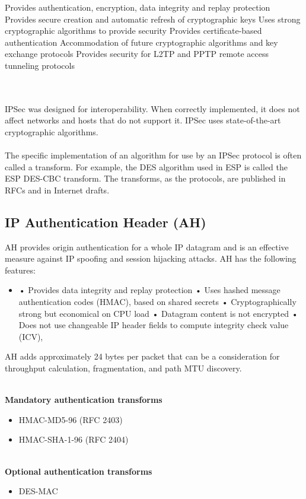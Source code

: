 \documentclass[10pt,a4paper]{article}
\begin{document}
\begin{itemize}
\begin{itemize}
\begin{itemize}
Provides authentication, encryption, data integrity and replay protection
Provides secure creation and automatic refresh of cryptographic keys
Uses strong cryptographic algorithms to provide security
Provides certificate-based authentication
Accommodation of future cryptographic algorithms and key exchange
protocols
Provides security for L2TP and PPTP remote access tunneling protocols
\end{itemize}
\\
\\
IPSec was designed for interoperability. When correctly implemented, it does not
affect networks and hosts that do not support it. IPSec uses state-of-the-art
cryptographic algorithms. 
\\
\\
The specific implementation of an algorithm for use by
an IPSec protocol is often called a transform. For example, the DES algorithm
used in ESP is called the ESP DES-CBC transform. The transforms, as the
protocols, are published in RFCs and in Internet drafts.


\subsection{IP Authentication Header (AH)}

AH provides origin authentication for a whole IP datagram and is an effective
measure against IP spoofing and session hijacking attacks. AH has the following
features:

\begin{itemize}
\item 
• Provides data integrity and replay protection
• Uses hashed message authentication codes (HMAC), based on shared
secrets
• Cryptographically strong but economical on CPU load
• Datagram content is not encrypted
• Does not use changeable IP header fields to compute integrity check value
(ICV),

\end{itemize}

AH adds approximately 24 bytes per packet that can be a consideration for
throughput calculation, fragmentation, and path MTU discovery.

\\
\textbf{Mandatory authentication transforms}
\begin{itemize}
\item HMAC-MD5-96 (RFC 2403)
\item HMAC-SHA-1-96 (RFC 2404)
\end{itemize}
\\
\textbf{Optional authentication transforms}
\begin{itemize}
\item DES-MAC
\end{itemize}



\end{itemize}
\end{itemize}
\end{document}

